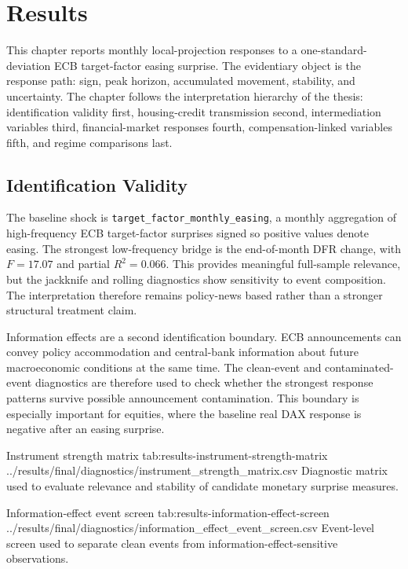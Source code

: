 \chapter{Results}
\label{chap:results}

This chapter reports monthly local-projection responses to a one-standard-deviation ECB target-factor easing surprise. The evidentiary object is the response path: sign, peak horizon, accumulated movement, stability, and uncertainty. The chapter follows the interpretation hierarchy of the thesis: identification validity first, housing-credit transmission second, intermediation variables third, financial-market responses fourth, compensation-linked variables fifth, and regime comparisons last.

\section{Identification Validity}

The baseline shock is \nolinkurl{target_factor_monthly_easing}, a monthly aggregation of high-frequency ECB target-factor surprises signed so positive values denote easing. The strongest low-frequency bridge is the end-of-month DFR change, with \(F=17.07\) and partial \(R^2=0.066\). This provides meaningful full-sample relevance, but the jackknife and rolling diagnostics show sensitivity to event composition. The interpretation therefore remains policy-news based rather than a stronger structural treatment claim.

Information effects are a second identification boundary. ECB announcements can convey policy accommodation and central-bank information about future macroeconomic conditions at the same time. The clean-event and contaminated-event diagnostics are therefore used to check whether the strongest response patterns survive possible announcement contamination. This boundary is especially important for equities, where the baseline real DAX response is negative after an easing surprise.

\artifacttable
  {Instrument strength matrix}
  {tab:results-instrument-strength-matrix}
  {../results/final/diagnostics/instrument_strength_matrix.csv}
  {Diagnostic matrix used to evaluate relevance and stability of candidate monetary surprise measures.}

\artifacttable
  {Information-effect event screen}
  {tab:results-information-effect-screen}
  {../results/final/diagnostics/information_effect_event_screen.csv}
  {Event-level screen used to separate clean events from information-effect-sensitive observations.}

